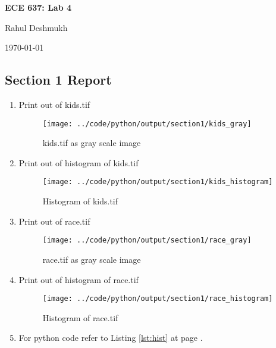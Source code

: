 \documentclass[a4paper,11pt]{article}
\newcommand{\reflst}[1]{Listing \ref{#1} at page \pageref{#1}}
\begin{document}
\begin{center}
\Large{\textbf{ECE 637: Lab 4}}

Rahul Deshmukh

\today
\end{center}

\subsection*{Section 1 Report} 

\begin{enumerate}
\item Print out of kids.tif
\begin{figure}[!hp]
 \centering
 \texttt{[image: ../code/python/output/section1/kids\_gray]}
 \caption{kids.tif as gray scale image}
\end{figure}

\clearpage
\item Print out of histogram of kids.tif
\begin{figure}[!hp]
 \centering
 \texttt{[image: ../code/python/output/section1/kids\_histogram]}
 \caption{Histogram of kids.tif}
\end{figure}

\clearpage
\item Print out of race.tif
\begin{figure}[!hp]
 \centering
 \texttt{[image: ../code/python/output/section1/race\_gray]}
 \caption{race.tif as gray scale image}
\end{figure}

\clearpage
\item Print out of histogram of race.tif
\begin{figure}[!hp]
 \centering
 \texttt{[image: ../code/python/output/section1/race\_histogram]}
 \caption{Histogram of race.tif}
\end{figure}

\item For python code refer to \reflst{lst:hist}.
\end{enumerate}

%
\clearpage
\vspace{2ex}
%
\end{document}
